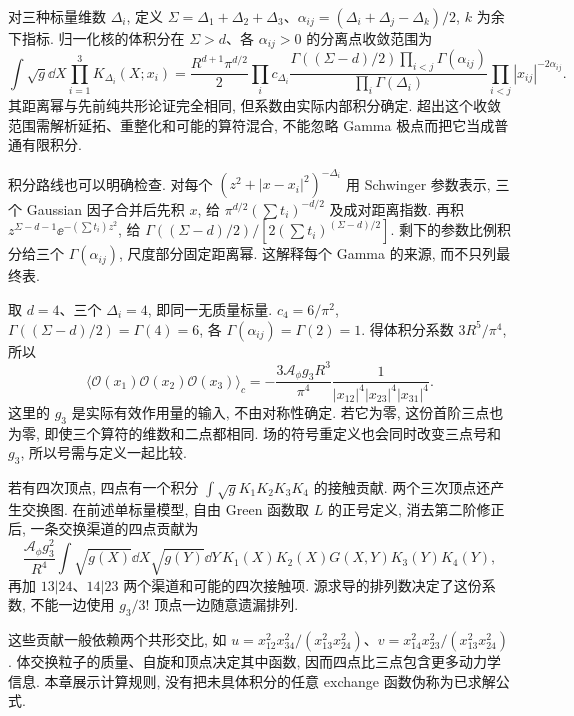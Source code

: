 对三种标量维数 $\Delta_i$, 定义 $\Sigma=\Delta_1+\Delta_2+\Delta_3$、$\alpha_{ij}=(\Delta_i+\Delta_j-\Delta_k)/2$, $k$ 为余下指标. 归一化核的体积分在 $\Sigma>d$、各 $\alpha_{ij}>0$ 的分离点收敛范围为
\[
\int\sqrt g\dd X\prod_{i=1}^3K_{\Delta_i}(X;x_i)
=\frac{R^{d+1}\pi^{d/2}}2\prod_ic_{\Delta_i}
\frac{\Gamma((\Sigma-d)/2)\prod_{i<j}\Gamma(\alpha_{ij})}
{\prod_i\Gamma(\Delta_i)}
\prod_{i<j}|x_{ij}|^{-2\alpha_{ij}}.
\]
其距离幂与先前纯共形论证完全相同, 但系数由实际内部积分确定. 超出这个收敛范围需解析延拓、重整化和可能的算符混合, 不能忽略 Gamma 极点而把它当成普通有限积分.

积分路线也可以明确检查. 对每个 $(z^2+|x-x_i|^2)^{-\Delta_i}$ 用 Schwinger 参数表示, 三个 Gaussian 因子合并后先积 $x$, 给 $\pi^{d/2}(\sum t_i)^{-d/2}$ 及成对距离指数. 再积 $z^{\Sigma-d-1}\ee^{-(\sum t_i)z^2}$, 给 $\Gamma((\Sigma-d)/2)/[2(\sum t_i)^{(\Sigma-d)/2}]$. 剩下的参数比例积分给三个 $\Gamma(\alpha_{ij})$, 尺度部分固定距离幂. 这解释每个 Gamma 的来源, 而不只列最终表.

\begin{example}
取 $d=4$、三个 $\Delta_i=4$, 即同一无质量标量. $c_4=6/\pi^2$, $\Gamma((\Sigma-d)/2)=\Gamma(4)=6$, 各 $\Gamma(\alpha_{ij})=\Gamma(2)=1$. 得体积分系数 $3R^5/\pi^4$, 所以
\[
\langle\mathcal O(x_1)\mathcal O(x_2)\mathcal O(x_3)\rangle_c
=-\frac{3\mathcal A_\phi g_3R^3}{\pi^4}
\frac1{|x_{12}|^4|x_{23}|^4|x_{31}|^4}.
\]
这里的 $g_3$ 是实际有效作用量的输入, 不由对称性确定. 若它为零, 这份首阶三点也为零, 即使三个算符的维数和二点都相同. 场的符号重定义也会同时改变三点号和 $g_3$, 所以号需与定义一起比较.
\end{example}

若有四次顶点, 四点有一个积分 $\int\sqrt gK_1K_2K_3K_4$ 的接触贡献. 两个三次顶点还产生交换图. 在前述单标量模型, 自由 Green 函数取 $L$ 的正号定义, 消去第二阶修正后, 一条交换渠道的四点贡献为
\[
\frac{\mathcal A_\phi g_3^2}{R^4}
\int\sqrt{g(X)}\dd X\sqrt{g(Y)}\dd Y\,
K_1(X)K_2(X)G(X,Y)K_3(Y)K_4(Y),
\]
再加 $13|24$、$14|23$ 两个渠道和可能的四次接触项. 源求导的排列数决定了这份系数, 不能一边使用 $g_3/3!$ 顶点一边随意遗漏排列.

\begin{center}
\end{center}
这些贡献一般依赖两个共形交比, 如 $u=x_{12}^2x_{34}^2/(x_{13}^2x_{24}^2)$、$v=x_{14}^2x_{23}^2/(x_{13}^2x_{24}^2)$. 体交换粒子的质量、自旋和顶点决定其中函数, 因而四点比三点包含更多动力学信息. 本章展示计算规则, 没有把未具体积分的任意 exchange 函数伪称为已求解公式.


